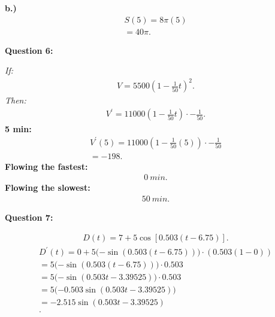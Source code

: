 \documentclass{report}
\begin{document}
    \bigbreak \noindent 
    \textbf{b.)}
    \begin{align*}
      S(5) = 8\pi (5) \\
      = 40\pi
    .\end{align*}

    \bigbreak \noindent \bigbreak \noindent 
    \begin{Large}
        \textbf{Question 6:}
    \end{Large}
    \bigbreak \noindent 
    \bigbreak \noindent 
    \textit{If:}
    \begin{align*}
      V = 5500(1-\frac{1}{50}t)^{2}
    .\end{align*}
    \bigbreak \noindent 
    \textit{Then:}
    \begin{align*}
      V^{\prime} = 11000(1-\frac{1}{50}t) \cdot -\frac{1}{50}
    .\end{align*}
    \bigbreak \noindent 
    \textbf{5 min:}
    \begin{align*}
      V^{\prime}(5) = 11000(1-\frac{1}{50}(5)) \cdot -\frac{1}{50} \\ 
      = -198
    .\end{align*}
    \bigbreak \noindent 
    \textbf{Flowing the fastest:}
    \begin{align*}
      0\ min
    .\end{align*}
    \bigbreak \noindent 
    \textbf{Flowing the slowest:}
    \begin{align*}
      50\ min
    .\end{align*}
    \bigbreak \noindent 

    \bigbreak \noindent \bigbreak \noindent 
    \begin{Large}
        \textbf{Question 7:}
    \end{Large}
    \bigbreak \noindent 
    \bigbreak \noindent 
    \begin{align*}
      D(t) = 7+5\cos{[0.503(t-6.75)]}
    .\end{align*}
    \begin{align*}
      D^{\prime}(t) =  0 + 5(-\sin{(0.503(t-6.75)))} \cdot (0.503(1 - 0)) \\ 
      =  5(-\sin{(0.503(t-6.75)))} \cdot 0.503\\ 
      =  5(-\sin{(0.503t-3.39525))} \cdot 0.503\\ 
      =  5(-0.503\sin{(0.503t-3.39525))} \\ 
      =  -2.515\sin{(0.503t-3.39525)}\\ 
    .\end{align*}
\end{document}

